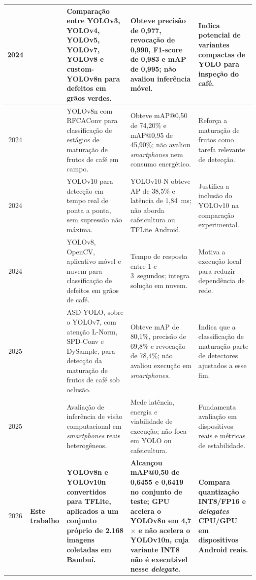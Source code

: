 \documentclass[artigo,times,capa]{iftex2024}
\begin{document}
\begin{board}[htbp]
{{\begin{tabular}{c p{3.0cm} p{3.6cm} p{4.0cm} p{4.3cm}}
\midrule
2024 & \textcite{Gope2024Comparative} & Comparação entre YOLOv3, YOLOv4, YOLOv5, YOLOv7,
YOLOv8 e custom-YOLOv8n para defeitos em grãos verdes. & Obteve precisão de
0,977, revocação de 0,990, F1-score de 0,983 e mAP de 0,995; não avaliou
inferência móvel. & Indica potencial de variantes compactas de \ac{YOLO} para
inspeção do café. \\
\midrule
2024 & \textcite{Kazama2024Monitoring} & YOLOv8n com RFCAConv para classificação de
estágios de maturação de frutos de café em campo. & Obteve mAP@0,50 de 74,20\%
e mAP@0,95 de 45,90\%; não avaliou \textit{smartphones} nem consumo energético.
& Reforça a maturação de frutos como tarefa relevante de detecção. \\
\midrule
2024 & \textcite{Wang2024YOLOv10} & YOLOv10 para detecção em tempo real de
ponta a ponta, sem supressão não máxima. & YOLOv10-N obteve AP de 38,5\% e latência de
1,84~ms; não aborda cafeicultura ou \ac{TFLite} Android. & Justifica a inclusão
do YOLOv10 na comparação experimental. \\
\midrule
2024 & \textcite{Thai2024Coffee} & YOLOv8, OpenCV, aplicativo móvel e nuvem para
classificação de defeitos em grãos de café. & Tempo de resposta entre 1 e 3~segundos; integra solução em nuvem. & Motiva a
execução local para reduzir dependência de rede. \\
\midrule
2025 & \textcite{Ye2025ASD} & ASD-YOLO, sobre o YOLOv7, com atenção
L-Norm, SPD-Conv e DySample, para detecção da maturação de frutos de café sob
oclusão. & Obteve \ac{mAP} de 80,1\%, precisão de 69,8\% e revocação de
78,4\%; não avaliou execução em \textit{smartphones}. & Indica que a
classificação de maturação parte de detectores ajustados a esse fim. \\
\midrule
2025 & \textcite{Hirsch2025Exploring} & Avaliação de inferência de visão computacional em
\textit{smartphones} reais heterogêneos. & Mede latência, energia e viabilidade
de execução; não foca em \ac{YOLO} ou cafeicultura. & Fundamenta avaliação em
dispositivos reais e métricas de estabilidade. \\
\midrule
2026 & \textbf{Este trabalho} & \textbf{YOLOv8n e YOLOv10n convertidos para
\ac{TFLite}, aplicados a um conjunto próprio de 2.168 imagens
coletadas em Bambuí.} & \textbf{Alcançou \ac{mAP}@0,50 de 0,6455 e 0,6419 no
conjunto de teste; \ac{GPU} acelera o YOLOv8n em 4,7$\times$ e não
acelera o YOLOv10n, cuja variante \ac{INT8} não é executável nesse
\textit{delegate}.} &
\textbf{Compara quantização \ac{INT8}/\ac{FP16} e \textit{delegates}
\ac{CPU}/\ac{GPU} em dispositivos Android reais.} \\
\bottomrule
\end{tabular}%
}%
}
\end{board}
\end{document}
